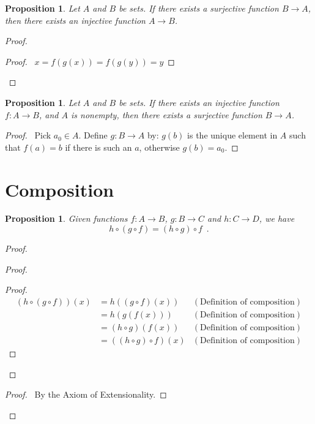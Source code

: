 \documentclass{book}
\let\qed\relax
\newtheorem{prop}[ax]{Proposition}
\theoremstyle{definition}
\begin{document}
\begin{prop}
Let $A$ and $B$ be sets. If there exists a surjective function $B \rightarrow A$, then there exists an injective function $A \rightarrow B$.
\end{prop}

\begin{proof}
\pf
{}
\begin{proof}
	\pf\ $x = f(g(x)) = f(g(y)) = y$
\end{proof}
\qed
\end{proof}

\begin{prop}
Let $A$ and $B$ be sets. If there exists an injective function $f : A \rightarrow B$, and $A$ is nonempty, then there exists a surjective function $B \rightarrow A$.
\end{prop}

\begin{proof}
\pf\ Pick $a_0 \in A$. Define $g : B \rightarrow A$ by: $g(b)$ is the unique element in $A$ such that $f(a) = b$ if there is such an $a$, otherwise $g(b) = a_0$. \qed
\end{proof}

\section{Composition}

\begin{prop}
Given functions $f : A \rightarrow B$, $g : B \rightarrow C$ and $h : C \rightarrow D$, we have
\[ h \circ (g \circ f) = (h \circ g) \circ f \enspace . \]
\end{prop}

\begin{proof}
\pf
{}
\begin{proof}
	\begin{proof}
		\pf
		\begin{align*}
			(h \circ (g \circ f))(x)
			& = h ((g \circ f)(x)) & (\text{Definition of composition}) \\
			& = h(g(f(x))) & (\text{Definition of composition}) \\
			& = (h \circ g)(f(x)) & (\text{Definition of composition}) \\
			& = ((h \circ g) \circ f)(x) & (\text{Definition of composition})
		\end{align*}
	\end{proof}
\end{proof}
\qedstep
\begin{proof}
	\pf\ By the Axiom of Extensionality.
\end{proof}
\qed
\end{proof}
\end{document}
